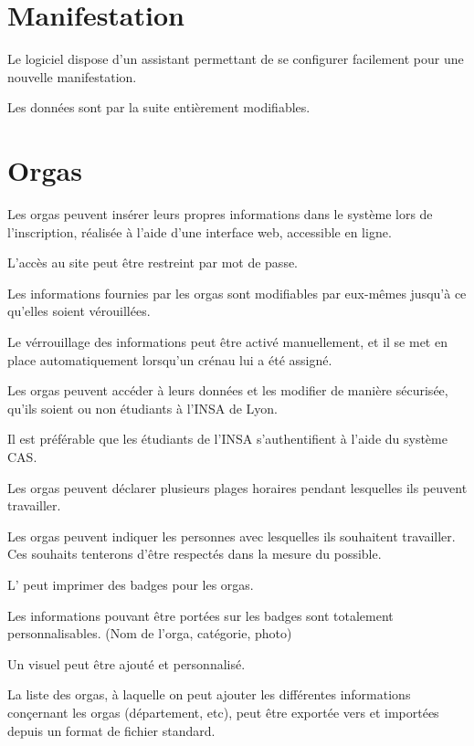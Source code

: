 \section{Manifestation}



Le logiciel dispose d'un assistant permettant de se configurer facilement pour une nouvelle manifestation.

Les données sont par la suite entièrement modifiables.



\section{Orgas}



Les orgas peuvent insérer leurs propres informations dans le système lors de l'inscription, réalisée à l'aide d'une interface web, accessible en ligne.

L'accès au site peut être restreint par mot de passe.

Les informations fournies par les orgas sont modifiables par eux-mêmes jusqu'à ce qu'elles soient vérouillées.

Le vérrouillage des informations peut être activé manuellement, et il se met en place automatiquement lorsqu'un crénau lui a été assigné.

Les orgas peuvent accéder à leurs données et les modifier de manière sécurisée, qu'ils soient ou non étudiants à l'INSA de Lyon.

Il est préférable que les étudiants de l'INSA s'authentifient à l'aide du système CAS.

Les orgas peuvent déclarer plusieurs plages horaires pendant lesquelles ils peuvent travailler.

Les orgas peuvent indiquer les personnes avec lesquelles ils souhaitent travailler. Ces souhaits tenterons d'être respectés dans la mesure du possible.

L'\oh{} peut imprimer des badges pour les orgas.

Les informations pouvant être portées sur les badges sont totalement personnalisables. (Nom de l'orga, catégorie, photo)

Un visuel peut être ajouté et personnalisé.


La liste des orgas, à laquelle on peut ajouter les différentes informations conçernant les orgas (département, etc), peut être exportée vers et importées depuis un format de fichier standard.


